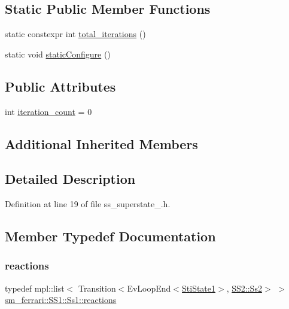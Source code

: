 \subsection*{Static Public Member Functions}
\begin{DoxyCompactItemize}
\item 
static constexpr int \hyperlink{structsm__ferrari_1_1SS1_1_1Ss1_a3d93e51d5e3b227103fa97d413b8a4a9}{total\+\_\+iterations} ()
\item 
static void \hyperlink{structsm__ferrari_1_1SS1_1_1Ss1_a44d7410da041fe02de3f9b8ca28801e8}{static\+Configure} ()
\end{DoxyCompactItemize}
\subsection*{Public Attributes}
\begin{DoxyCompactItemize}
\item 
int \hyperlink{structsm__ferrari_1_1SS1_1_1Ss1_a00f5c12752a8e4666f26c05995e25ad7}{iteration\+\_\+count} = 0
\end{DoxyCompactItemize}
\subsection*{Additional Inherited Members}


\subsection{Detailed Description}


Definition at line 19 of file ss\+\_\+superstate\+\_.\+h.



\subsection{Member Typedef Documentation}
\mbox{\label{structsm__ferrari_1_1SS1_1_1Ss1_a389c14039be3368c32e5da394ef48177}} 
\subsubsection{\texorpdfstring{reactions}{reactions}}
{\footnotesize\ttfamily typedef mpl\+::list$<$ Transition$<$Ev\+Loop\+End$<$\hyperlink{structsm__ferrari_1_1inner__states_1_1StiState1}{Sti\+State1}$>$, \hyperlink{structsm__ferrari_1_1SS2_1_1Ss2}{S\+S2\+::\+Ss2}$>$ $>$ \hyperlink{structsm__ferrari_1_1SS1_1_1Ss1_a389c14039be3368c32e5da394ef48177}{sm\+\_\+ferrari\+::\+S\+S1\+::\+Ss1\+::reactions}}



